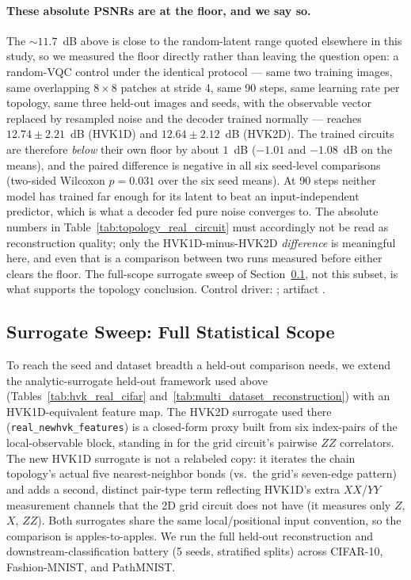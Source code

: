 \documentclass[11pt]{article}
\begin{document}
\paragraph{These absolute PSNRs are at the floor, and we say so.} The $\sim\!11.7$~dB above is close to the random-latent range quoted elsewhere in this study, so we measured the floor directly rather than leaving the question open: a random-VQC control under the identical protocol --- same two training images, same overlapping $8\times8$ patches at stride 4, same 90 steps, same learning rate per topology, same three held-out images and seeds, with the observable vector replaced by resampled noise and the decoder trained normally --- reaches $12.74\pm2.21$~dB (HVK1D) and $12.64\pm2.12$~dB (HVK2D). The trained circuits are therefore \emph{below} their own floor by about $1$~dB ($-1.01$ and $-1.08$~dB on the means), and the paired difference is negative in all six seed-level comparisons (two-sided Wilcoxon $p=0.031$ over the six seed means). At 90 steps neither model has trained far enough for its latent to beat an input-independent predictor, which is what a decoder fed pure noise converges to. The absolute numbers in Table~\ref{tab:topology_real_circuit} must accordingly not be read as reconstruction quality; only the HVK1D-minus-HVK2D \emph{difference} is meaningful here, and even that is a comparison between two runs measured before either clears the floor. The full-scope surrogate sweep of Section~\ref{sec:topology_surrogate}, not this subset, is what supports the topology conclusion. Control driver: ; artifact .

\subsection{Surrogate Sweep: Full Statistical Scope}
\label{sec:topology_surrogate}
To reach the seed and dataset breadth a held-out comparison needs, we extend the analytic-surrogate held-out framework used above (Tables~\ref{tab:hvk_real_cifar} and~\ref{tab:multi_dataset_reconstruction}) with an HVK1D-equivalent feature map. The HVK2D surrogate used there (\texttt{real\_newhvk\_features}) is a closed-form proxy built from six index-pairs of the local-observable block, standing in for the grid circuit's pairwise $ZZ$ correlators. The new HVK1D surrogate is not a relabeled copy: it iterates the chain topology's actual five nearest-neighbor bonds (vs.\ the grid's seven-edge pattern) and adds a second, distinct pair-type term reflecting HVK1D's extra $XX$/$YY$ measurement channels that the 2D grid circuit does not have (it measures only $Z$, $X$, $ZZ$). Both surrogates share the same local/positional input convention, so the comparison is apples-to-apples. We run the full held-out reconstruction and downstream-classification battery (5 seeds, stratified splits) across CIFAR-10, Fashion-MNIST, and PathMNIST.
\end{document}
